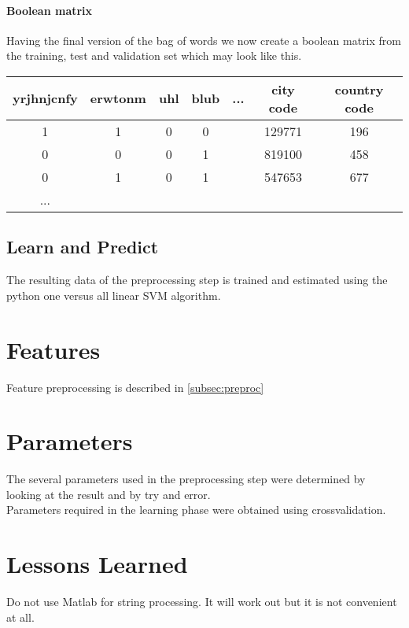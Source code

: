 \documentclass[a4paper, 11pt]{article}
\begin{document}
\paragraph{Boolean matrix} Having the final version of the bag of words we now create a boolean matrix from the training, test and validation set which may look like this.

\begin{tabular}{|c|c|c|c|c|c|c|}
\hline 
yrjhnjcnfy & erwtonm & uhl & blub & ... & city code & country code \\ 
\hline 
1 & 1 & 0 & 0 &  & 129771 & 196 \\ 
\hline 
0 & 0 & 0 & 1 &  & 819100 & 458 \\ 
\hline 
0 & 1 & 0 & 1 &  & 547653 & 677 \\ 
\hline 
... &  &  &  &  &  &  \\ 
\hline 
\end{tabular} 

\subsection{Learn and Predict} 
The resulting data of the preprocessing step is trained and estimated using the python one versus all linear SVM algorithm.


\section{Features}

Feature preprocessing is described in \ref{subsec:preproc}

\section{Parameters}

The several parameters used in the preprocessing step were determined by looking at the result and by try and error.\\

Parameters required in the learning phase were obtained using crossvalidation.


\section{Lessons Learned} 

Do not use Matlab for string processing. It will work out but it is not convenient at all.
\end{document}
